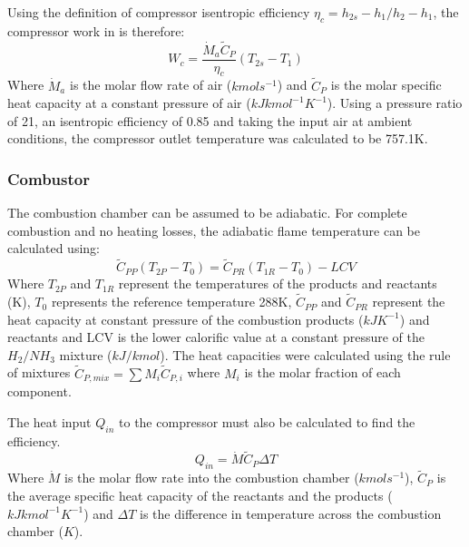 \documentclass[11pt, oneside]{article}
\begin{document}
Using the definition of compressor isentropic efficiency $\eta_c = {h_{2s} - h_1}/{h_2 - h_1} $, the compressor work in is therefore:
\begin{equation}
W_{c} = \frac {\dot{M}_a \tilde{C}_P}{\eta_c} (T_{2s} - T_1)
\end{equation}
Where $\dot{M}_a$ is the molar flow rate of air ($kmols^{-1}$) and $\tilde{C}_P$ is the molar specific heat capacity at a constant pressure of air ($kJkmol^{-1}K^{-1}$). Using a pressure ratio of 21, an isentropic efficiency of 0.85 \cite{website:compressoreff} and taking the input air at ambient conditions, the compressor outlet temperature was calculated to be 757.1K.  

\subsubsection{Combustor} 
The combustion chamber can be assumed to be adiabatic. For complete combustion and no heating losses, the adiabatic flame temperature can be calculated using:
\begin{equation}
\tilde{C}_{PP} (T_{2P} - T_0) = \tilde{C}_{PR} (T_{1R} - T_0) - LCV 
\end{equation}
Where $T_{2P}$ and $T_{1R}$ represent the temperatures of the products and reactants (K), $T_0$ represents the reference temperature 288K, $\tilde{C}_{PP}$ and $\tilde{C}_{PR}$ represent the heat capacity at constant pressure of the combustion products ($kJK^{-1}$) and reactants and LCV is the lower calorific value at a constant pressure of the $H_2/NH_3$ mixture ($kJ/kmol$). The heat capacities were calculated using the rule of mixtures $\tilde{C}_{P, mix} = \sum\nolimits M_i \tilde{C}_{P, i}$ where $M_i$ is the molar fraction of each component. 

The heat input $Q_{in}$ to the compressor must also be calculated to find the efficiency.
\begin{equation} \label{eq:heatequation}
Q_{in} = \dot{M}\tilde{C}_P\Delta T
\end{equation}
Where $\dot{M}$ is the molar flow rate into the combustion chamber ($kmols^{-1}$), $\tilde{C}_P$ is the average specific heat capacity of the reactants and the products ($kJ kmol^{-1} K^{-1}$) and $\Delta T$ is the difference in temperature across the combustion chamber ($K$).
\end{document}
